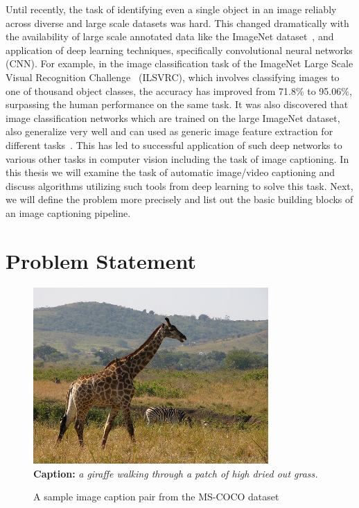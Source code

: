 Until recently, the task of identifying even a single object in an image
reliably across diverse and large scale datasets was hard.
This changed dramatically with the availability of large scale annotated data
like the ImageNet dataset~\cite{ImagenetOrig}, and  application of deep learning
techniques, specifically convolutional neural networks (CNN).
For example, in the image classification task of the ImageNet Large Scale Visual
Recognition Challenge~\cite{ILSVRC15} (ILSVRC), which involves classifying
images to one of thousand object classes, the accuracy has improved from 71.8\%
to 95.06\%, surpassing the human performance on the same task. 
It was also discovered that image classification networks which are trained on
the large ImageNet dataset, also generalize very well and can used as generic
image feature extraction for different tasks~\cite{yosinski2014transferable}.
This has led to successful application of such deep networks to various other
tasks in computer vision including the task of image captioning.
In this thesis we will examine the task of automatic image/video captioning and
discuss algorithms utilizing such tools from deep learning to solve this task.
Next, we will define the problem more precisely and list out the basic building
blocks of an image captioning pipeline.

\section{Problem Statement}
\begin{figure}[th]
	\centering
	\includegraphics[width=0.8\textwidth]{./images/COCO_train2014_000000544856.jpg}\\
    \textbf{Caption:} \emph{a giraffe walking through a patch of high dried out grass.}
	\caption{A sample image caption pair from the MS-COCO dataset}
	\label{fig:ExampleCap}
\end{figure}

